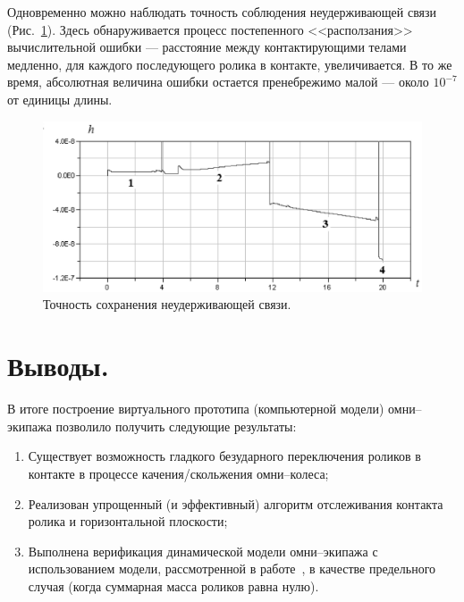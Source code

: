 \documentclass[12pt,a4paper]{article}
\begin{document}
Одновременно можно наблюдать точность соблюдения неудерживающей связи 
(Рис.~\ref{fig2}). Здесь обнаруживается процесс постепенного <<расползания>>
вычислительной ошибки --- расстояние между контактирующими телами медленно, для
каждого последующего ролика в контакте, увеличивается. В то же время, 
абсолютная величина ошибки остается пренебрежимо малой --- около $10^{-7}$
от единицы длины.
\begin{figure}[htb]
\centerline{\includegraphics[width=15cm]{Figure21.eps}}
\caption{Точность сохранения неудерживающей связи.}
\label{fig2}
\end{figure}

\section{Выводы.\ }

В итоге построение виртуального прототипа (компьютерной модели) омни--экипажа 
позволило получить следующие результаты:
\begin{enumerate}

\item
Существует возможность гладкого безударного переключения роликов в контакте в
процессе качения/скольжения омни--колеса;

\item
Реализован упрощенный (и эффективный) алгоритм отслеживания контакта ролика и 
горизонтальной плоскости;

\item
Выполнена верификация динамической модели омни--экипажа с использованием 
модели, рассмотренной в работе~\cite{BorisovKilinMamaev}, в качестве 
предельного случая (когда суммарная масса роликов равна нулю).

\end{enumerate}
\end{document}
